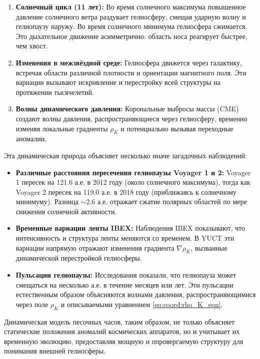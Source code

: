 \documentclass[12pt,a4paper]{article}
\theoremstyle{remark}
\begin{document}
	\begin{enumerate}
		\item \textbf{Солнечный цикл (11 лет):} Во время солнечного максимума повышенное давление солнечного ветра раздувает гелиосферу, смещая ударную волну и гелиопаузу наружу. Во время солнечного минимума гелиосфера сжимается. Это дыхательное движение асимметрично: область носа реагирует быстрее, чем хвост.
		
		\item \textbf{Изменения в межзвёздной среде:} Гелиосфера движется через галактику, встречая области различной плотности и ориентации магнитного поля. Эти вариации вызывают искривление и перестройку всей структуры на протяжении тысячелетий.
		
		\item \textbf{Волны динамического давления:} Корональные выбросы массы (CME) создают волны давления, распространяющиеся через гелиосферу, временно изменяя локальные градиенты $\rho_K$ и потенциально вызывая переходные аномалии.
	\end{enumerate}
	
	Эта динамическая природа объясняет несколько иначе загадочных наблюдений:
	\begin{itemize}
		\item \textbf{Различные расстояния пересечения гелиопаузы Voyager 1 и 2:} Voyager 1 пересек на 121.6 а.е. в 2012 году (около солнечного максимума), тогда как Voyager 2 пересек на 119.0 а.е. в 2018 году (приближаясь к солнечному минимуму). Разница $\sim2.6$ а.е. отражает сжатие полярных областей по мере снижения солнечной активности.
		
		\item \textbf{Временные вариации ленты IBEX:} Наблюдения IBEX показывают, что интенсивность и структура ленты меняются со временем. В YUCT эти вариации напрямую отражают изменения градиента $\nabla \rho_K$, вызванные динамической перестройкой гелиосферы.
		
		\item \textbf{Пульсации гелиопаузы:} Исследования показали, что гелиопауза может смещаться на несколько а.е. в течение месяцев или лет. Эти пульсации естественным образом объясняются волнами давления, распространяющимися через поле $\rho_K$ и описываемыми уравнением \eqref{eq:coord:rho_K_eqn}.
	\end{itemize}
	
	Динамическая модель песочных часов, таким образом, не только объясняет статические положения аномалий космических аппаратов, но и учитывает их временную эволюцию, предоставляя мощную и опровергаемую структуру для понимания внешней гелиосферы.
	
\end{document}
